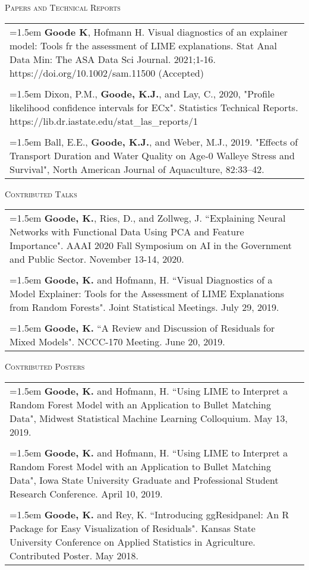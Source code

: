 \documentclass[10pt, oneside]{article}
\begin{document}
\noindent \textsc{Papers and Technical Reports} \hrulefill
\begin{longtable}{p{16.5cm}}
\hangindent=1.5em \textbf{Goode K}, Hofmann H. Visual diagnostics of an explainer model: Tools fr the assessment of LIME explanations. Stat Anal Data Min: The ASA Data Sci Journal. 2021;1-16. https://doi.org/10.1002/sam.11500 (Accepted)\\
\\
\hangindent=1.5em Dixon, P.M., \textbf{Goode, K.J.}, and Lay, C., 2020, "Profile likelihood confidence intervals for ECx". Statistics Technical Reports. https://lib.dr.iastate.edu/stat\_las\_reports/1\\
\\
\hangindent=1.5em Ball, E.E., \textbf{Goode, K.J.}, and Weber, M.J., 2019. "Effects of Transport Duration and Water Quality on Age-0 Walleye Stress and Survival", North American Journal of Aquaculture, 82:33–42.
\end{longtable}

\noindent \textsc{Contributed Talks} \hrulefill
\begin{longtable}{p{16.5cm}}
\hangindent=1.5em \textbf{Goode, K.}, Ries, D., and Zollweg, J. ``Explaining Neural Networks with Functional Data Using PCA and Feature Importance". AAAI 2020 Fall Symposium on AI in the Government and Public Sector. November 13-14, 2020.\\
\\
\hangindent=1.5em \textbf{Goode, K.} and Hofmann, H. ``Visual Diagnostics of a Model Explainer: Tools for the Assessment of LIME Explanations from Random Forests". Joint Statistical Meetings. July 29, 2019.\\
\\
\hangindent=1.5em \textbf{Goode, K.} ``A Review and Discussion of Residuals for Mixed Models". NCCC-170 Meeting. June 20, 2019.
\end{longtable}

\noindent \textsc{Contributed Posters} \hrulefill
\begin{longtable}{p{16.5cm}}
\hangindent=1.5em \textbf{Goode, K.} and Hofmann, H. ``Using LIME to Interpret a Random Forest Model with an Application to Bullet Matching Data", Midwest Statistical Machine Learning Colloquium. May 13, 2019.\\
\\ 
\hangindent=1.5em \textbf{Goode, K.} and Hofmann, H. ``Using LIME to Interpret a Random Forest Model with an Application to Bullet Matching Data", Iowa State University Graduate and Professional Student Research Conference. April 10, 2019.\\
\\ 
\hangindent=1.5em \textbf{Goode, K.} and Rey, K. ``Introducing ggResidpanel: An R Package for Easy Visualization of Residuals". Kansas State University Conference on Applied Statistics in Agriculture. Contributed Poster. May 2018.
\end{longtable}
\end{document}
